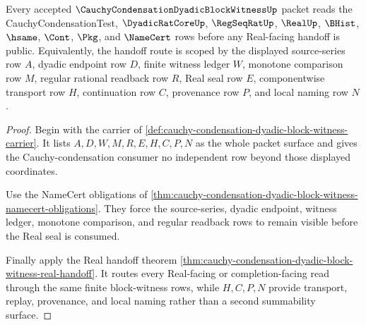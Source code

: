\begin{theorem}
\label{thm:cauchy-condensation-dyadic-block-witness-scope}
Every accepted $\CauchyCondensationDyadicBlockWitnessUp$ packet reads the CauchyCondensationTest, $\DyadicRatCoreUp$, $\RegSeqRatUp$, $\RealUp$, $\BHist$, $\hsame$, $\Cont$, $\Pkg$, and $\NameCert$ rows before any Real-facing handoff is public. Equivalently, the handoff route is scoped by the displayed source-series row $A$, dyadic endpoint row $D$, finite witness ledger $W$, monotone comparison row $M$, regular rational readback row $R$, Real seal row $E$, componentwise transport row $H$, continuation row $C$, provenance row $P$, and local naming row $N$.
\end{theorem}
\begin{proof}
Begin with the carrier of \autoref{def:cauchy-condensation-dyadic-block-witness-carrier}. It lists $A,D,W,M,R,E,H,C,P,N$ as the whole packet surface and gives the Cauchy-condensation consumer no independent row beyond those displayed coordinates.

Use the NameCert obligations of \autoref{thm:cauchy-condensation-dyadic-block-witness-namecert-obligations}. They force the source-series, dyadic endpoint, witness ledger, monotone comparison, and regular readback rows to remain visible before the Real seal is consumed.

Finally apply the Real handoff theorem \autoref{thm:cauchy-condensation-dyadic-block-witness-real-handoff}. It routes every Real-facing or completion-facing read through the same finite block-witness rows, while $H,C,P,N$ provide transport, replay, provenance, and local naming rather than a second summability surface.
\end{proof}

